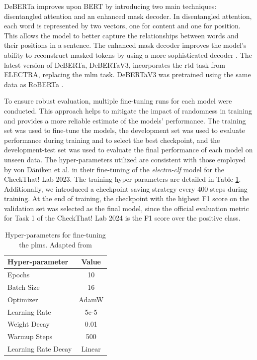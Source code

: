 DeBERTa improves upon BERT by introducing two main techniques: disentangled attention and an enhanced mask decoder. In disentangled attention, each word is represented by two vectors, one for content and one for position. This allows the model to better capture the relationships between words and their positions in a sentence. The enhanced mask decoder improves the model’s ability to reconstruct masked tokens by using a more sophisticated decoder \cite{he2021debertav3}. The latest version of DeBERTa, DeBERTaV3, incorporates the \gls{rtd} task from ELECTRA, replacing the \gls{mlm} task. DeBERTaV3 was pretrained using the same data as RoBERTa \cite{he2021debertav3}.

To ensure robust evaluation, multiple fine-tuning runs for each model were conducted. This approach helps to mitigate the impact of randomness in training and provides a more reliable estimate of the models' performance.
The training set was used to fine-tune the models, the development set was used to evaluate performance during training and to select the best checkpoint, and the development-test set was used to evaluate the final performance of each model on unseen data.
The hyper-parameters utilized are consistent with those employed by von Däniken et al. \cite{vondaniken2023} in their fine-tuning of the \textit{electra-clf} model for the CheckThat! Lab 2023. The training hyper-parameters are detailed in Table \ref{tab:hyperparam}. Additionally, we introduced a checkpoint saving strategy every 400 steps during training. At the end of training, the checkpoint with the highest F1 score on the validation set was selected as the final model, since the official evaluation metric for Task 1 of the CheckThat! Lab 2024 is the F1 score over the positive class.  


\begin{table}[h]
    \centering
    \begin{tabular}{l|c}
    \hline
         \textbf{Hyper-parameter}&Value\\
    \hline
         Epochs&10\\
         Batch Size&16\\
         Optimizer&AdamW\cite {adam_w}\\
         Learning Rate&5e-5\\
         Weight Decay&0.01\\
         Warmup Steps&500\\
         Learning Rate Decay&Linear\\
    \hline
    \end{tabular}
    \caption{Hyper-parameters for fine-tuning the \glspl{plm}. Adapted from \cite{}}
    \label{tab:hyperparam}
\end{table}

